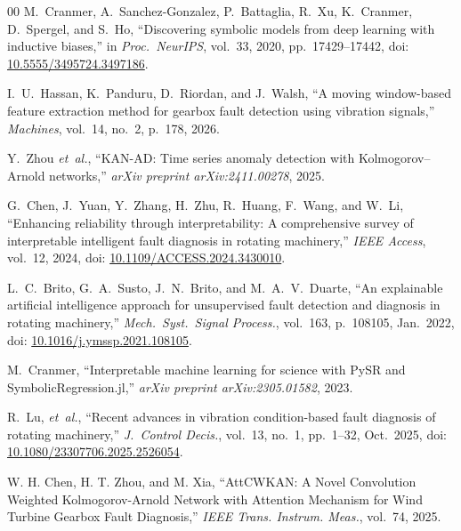 \documentclass[conference]{IEEEtran}
\begin{document}
\begin{thebibliography}{00}
M.~Cranmer, A.~Sanchez-Gonzalez, P.~Battaglia, R.~Xu, K.~Cranmer,
D.~Spergel, and S.~Ho,
``Discovering symbolic models from deep learning with inductive biases,''
in \textit{Proc.\ NeurIPS},
vol.~33, 2020, pp.\ 17429--17442,
doi: \href{https://doi.org/10.5555/3495724.3497186}{10.5555/3495724.3497186}.

I.~U.~Hassan, K.~Panduru, D.~Riordan, and J.~Walsh,
``A moving window-based feature extraction method for gearbox fault detection
using vibration signals,''
\textit{Machines}, vol.~14, no.~2, p.~178, 2026.

Y.~Zhou \textit{et~al.},
``KAN-AD: Time series anomaly detection with Kolmogorov--Arnold networks,''
\textit{arXiv preprint arXiv:2411.00278}, 2025.

G.~Chen, J.~Yuan, Y.~Zhang, H.~Zhu, R.~Huang, F.~Wang, and W.~Li,
``Enhancing reliability through interpretability: A comprehensive survey
of interpretable intelligent fault diagnosis in rotating machinery,''
\textit{IEEE Access}, vol.~12, 2024,
doi: \href{https://doi.org/10.1109/ACCESS.2024.3430010}{10.1109/ACCESS.2024.3430010}.

L.~C.~Brito, G.~A.~Susto, J.~N.~Brito, and M.~A.~V.~Duarte,
``An explainable artificial intelligence approach for unsupervised fault
detection and diagnosis in rotating machinery,''
\textit{Mech.\ Syst.\ Signal Process.}, vol.~163, p.~108105, Jan.\ 2022,
doi: \href{https://doi.org/10.1016/j.ymssp.2021.108105}{10.1016/j.ymssp.2021.108105}.

M.~Cranmer,
``Interpretable machine learning for science with {PySR} and
{SymbolicRegression.jl},''
\textit{arXiv preprint arXiv:2305.01582}, 2023.

R.~Lu, \textit{et~al.},
``Recent advances in vibration condition-based fault diagnosis of
rotating machinery,''
\textit{J.\ Control Decis.}, vol.~13, no.~1, pp.\ 1--32, Oct.\ 2025,
doi: \href{https://doi.org/10.1080/23307706.2025.2526054}{10.1080/23307706.2025.2526054}.

W. H. Chen, H. T. Zhou, and M. Xia, ``AttCWKAN: A Novel Convolution
Weighted Kolmogorov-Arnold Network with Attention Mechanism for Wind
Turbine Gearbox Fault Diagnosis,'' \textit{IEEE Trans. Instrum. Meas.},
vol.~74, 2025.

\end{thebibliography}
\end{document}
